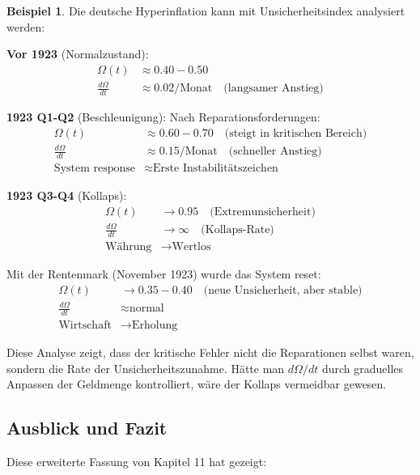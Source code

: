 \documentclass[a4paper,12pt,twoside]{report}
\theoremstyle{definition}
\newtheorem{beispiel}{Beispiel}
\begin{document}
\begin{beispiel}

Die deutsche Hyperinflation kann mit Unsicherheitsindex analysiert werden:

\textbf{Vor 1923} (Normalzustand):
\begin{align}
\Omega(t) &\approx 0.40-0.50 \\
\frac{d\Omega}{dt} &\approx 0.02/\text{Monat} \quad \text{(langsamer Anstieg)}
\end{align}

\textbf{1923 Q1-Q2} (Beschleunigung):
Nach Reparationsforderungen:
\begin{align}
\Omega(t) &\approx 0.60-0.70 \quad \text{(steigt in kritischen Bereich)} \\
\frac{d\Omega}{dt} &\approx 0.15/\text{Monat} \quad \text{(schneller Anstieg)} \\
\text{System response} &\approx \text{Erste Instabilitätszeichen}
\end{align}

\textbf{1923 Q3-Q4} (Kollaps):
\begin{align}
\Omega(t) &\to 0.95 \quad \text{(Extremunsicherheit)} \\
\frac{d\Omega}{dt} &\to \infty \quad \text{(Kollaps-Rate)} \\
\text{Währung} &\to \text{Wertlos}
\end{align}

Mit der Rentenmark (November 1923) wurde das System reset:
\begin{align}
\Omega(t) &\to 0.35-0.40 \quad \text{(neue Unsicherheit, aber stable)} \\
\frac{d\Omega}{dt} &\approx \text{normal} \\
\text{Wirtschaft} &\to \text{Erholung}
\end{align}

Diese Analyse zeigt, dass der kritische Fehler nicht die Reparationen selbst waren, sondern die Rate der Unsicherheitszunahme. Hätte man $d\Omega/dt$ durch graduelles Anpassen der Geldmenge kontrolliert, wäre der Kollaps vermeidbar gewesen.

\end{beispiel}

\subsection{Ausblick und Fazit}

Diese erweiterte Fassung von Kapitel 11 hat gezeigt:
\end{document}
